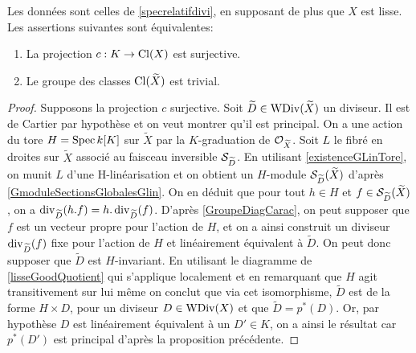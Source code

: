 \begin{thm}\label{clgtrivial}
Les données sont celles de \ref{specrelatifdivi}, en supposant de plus que $X$ est lisse. Les assertions suivantes sont équivalentes:
\begin{enumerate}
\item La projection $c:K\rightarrow \operatorname{Cl}(X)$ est surjective.
\item Le groupe des classes $\operatorname{Cl}(\widetilde{X})$ est trivial.
\end{enumerate}
\end{thm}
\begin{proof}
Supposons la projection $c$ surjective. Soit $\widetilde{D}\in \operatorname{WDiv}(\widetilde{X})$ un diviseur. Il est de Cartier par hypothèse et on veut montrer qu'il est principal. On a une action du tore $H=\operatorname{Spec} k[K]$ sur $\widetilde{X}$ par la $K$-graduation de $\mathcal{O}_{\widetilde{X}}$. Soit $L$ le fibré en droites sur $\widetilde{X}$ associé au faisceau inversible $\mathcal{S}_{\widetilde{D}}$. En utilisant \ref{existenceGLinTore}, on munit $L$ d'une H-linéarisation et on obtient un $H$-module $\mathcal{S}_{\widetilde{D}}(\widetilde{X})$ d'après \ref{GmoduleSectionsGlobalesGlin}. On en déduit que pour tout $h\in H$ et $f\in \mathcal{S}_{\widetilde{D}}(\widetilde{X})$, on a $\operatorname{div}_{\widetilde{D}}(h.f)=h.\operatorname{div}_{\widetilde{D}}(f)$. D'après \ref{GroupeDiagCarac}, on peut supposer que $f$ est un vecteur propre pour l'action de $H$, et on a ainsi construit un diviseur $\operatorname{div}_{\widetilde{D}}(f)$ fixe pour l'action de $H$ et linéairement équivalent à $\widetilde{D}$. On peut donc supposer que $\widetilde{D}$ est $H$-invariant. En utilisant le diagramme de \ref{lisseGoodQuotient} qui s'applique localement et en remarquant que $H$ agit transitivement sur lui même on conclut que via cet isomorphisme, $\widetilde{D}$ est de la forme $H\times D$, pour un diviseur $D\in \operatorname{WDiv}(X)$ et que $\widetilde{D}=p^*(D)$. Or, par hypothèse $D$ est linéairement équivalent à un $D'\in K$, on a ainsi le résultat car $p^*(D')$ est principal d'après la proposition précédente.


\end{proof}
